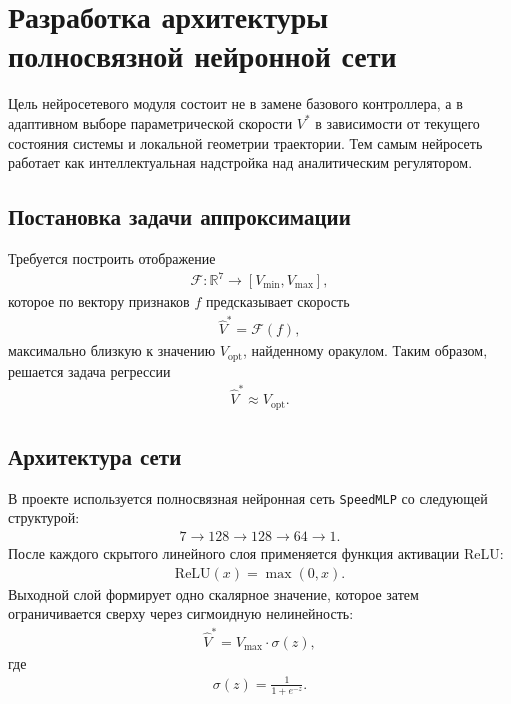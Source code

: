 

\section{Разработка архитектуры полносвязной нейронной сети}

Цель нейросетевого модуля состоит не в замене базового контроллера, а в адаптивном выборе параметрической скорости $V^{\ast}$ в зависимости от текущего состояния системы и локальной геометрии траектории.
Тем самым нейросеть работает как интеллектуальная надстройка над аналитическим регулятором.

\subsection{Постановка задачи аппроксимации}

Требуется построить отображение
\begin{gather}
    \mathcal{F}: \mathbb{R}^{7} \rightarrow [V_{\min}, V_{\max}],
\end{gather}
которое по вектору признаков $f$ предсказывает скорость
\begin{gather}
    \hat{V}^{\ast} = \mathcal{F}(f),
\end{gather}
максимально близкую к значению $V_{\mathrm{opt}}$, найденному оракулом. Таким образом, решается задача регрессии
\begin{gather}
    \hat{V}^{\ast} \approx V_{\mathrm{opt}}.
\end{gather}

\subsection{Архитектура сети}

В проекте используется полносвязная нейронная сеть \texttt{SpeedMLP} со следующей структурой:
\begin{gather}
    7 \rightarrow 128 \rightarrow 128 \rightarrow 64 \rightarrow 1.
\end{gather}
После каждого скрытого линейного слоя применяется функция активации ReLU:
\begin{gather}
    \mathrm{ReLU}(x) = \max(0, x).
\end{gather}
Выходной слой формирует одно скалярное значение, которое затем ограничивается сверху через сигмоидную нелинейность:
\begin{gather}
    \hat{V}^{\ast} = V_{\max} \cdot \sigma(z),
\end{gather}
где
\begin{gather}
    \sigma(z) = \frac{1}{1 + e^{-z}}.
\end{gather}

